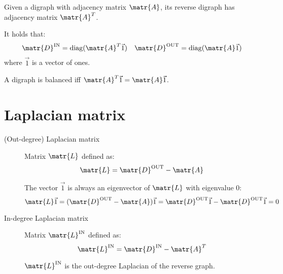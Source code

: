 \begin{description}
        \begin{remark}
            Given a digraph with adjacency matrix $\matr{A}$, its reverse digraph has adjacency matrix $\matr{A}^T$.
        \end{remark}

        \begin{remark}
            It holds that:
            \[ 
                \matr{D}^\text{IN} = \text{diag}(\matr{A}^T \vec{1}) 
                \quad
                \matr{D}^\text{OUT} = \text{diag}(\matr{A} \vec{1})
            \]
            where $\vec{1}$ is a vector of ones.
        \end{remark}

        \begin{remark}
            A digraph is balanced iff $\matr{A}^T \vec{1} = \matr{A} \vec{1}$.
        \end{remark}
\end{description}



\section{Laplacian matrix}

\begin{description}
    \item[(Out-degree) Laplacian matrix] 
        Matrix $\matr{L}$ defined as:
        \[ \matr{L} = \matr{D}^\text{OUT} - \matr{A} \]

        \begin{remark}
            The vector $\vec{1}$ is always an eigenvector of $\matr{L}$ with eigenvalue $0$:
            \[ \matr{L}\vec{1} = (\matr{D}^\text{OUT} - \matr{A})\vec{1} = \matr{D}^\text{OUT}\vec{1} - \matr{D}^\text{OUT}\vec{1} = 0 \]
        \end{remark}

    \item[In-degree Laplacian matrix] 
        Matrix $\matr{L}^\text{IN}$ defined as:
        \[ \matr{L}^\text{IN} = \matr{D}^\text{IN} - \matr{A}^T \]

        \begin{remark}
            $\matr{L}^\text{IN}$ is the out-degree Laplacian of the reverse graph.    
        \end{remark}
\end{description}